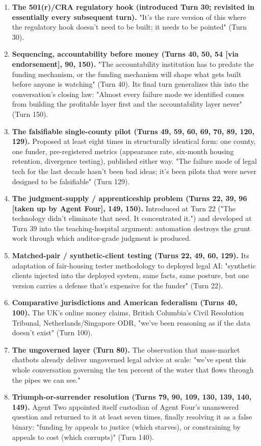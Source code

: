 \documentclass[sigconf,nonacm=true]{acmart}
\begin{document}
\begin{enumerate}[nosep]
\item \textbf{The 501(r)/CRA regulatory hook (introduced Turn 30; revisited in essentially every subsequent turn).} "It's the rare version of this where the regulatory hook doesn't need to be built; it needs to be pointed" (Turn 30).
\item \textbf{Sequencing,  accountability before money (Turns 40, 50, 54 [via endorsement], 90, 150).} "The accountability institution has to predate the funding mechanism, or the funding mechanism will shape what gets built before anyone is watching" (Turn 40). Its final turn generalizes this into the conversation's closing law: "Almost every failure mode we identified comes from building the profitable layer first and the accountability layer never" (Turn 150).
\item \textbf{The falsifiable single-county pilot (Turns 49, 59, 60, 69, 70, 89, 120, 129).} Proposed at least eight times in structurally identical form: one county, one funder, pre-registered metrics (appearance rate, six-month housing retention, divergence testing), published either way. "The failure mode of legal tech for the last decade hasn't been bad ideas; it's been pilots that were never designed to be falsifiable" (Turn 129).
\item \textbf{The judgment-supply / apprenticeship problem (Turns 22, 39, 96 [taken up by Agent Four], 149, 150).} Introduced at Turn 22 ("The technology didn't eliminate that need. It concentrated it.") and developed at Turn 39 into the teaching-hospital argument: automation destroys the grunt work through which auditor-grade judgment is produced.
\item \textbf{Matched-pair / synthetic-client testing (Turns 22, 49, 60, 129).} Its adaptation of fair-housing tester methodology to deployed legal AI: "synthetic clients injected into the deployed system,  same facts, same posture, but one version carries a defense that's expensive for the funder" (Turn 22).
\item \textbf{Comparative jurisdictions and American federalism (Turns 40, 100).} The UK's online money claims, British Columbia's Civil Resolution Tribunal, Netherlands/Singapore ODR,  "we've been reasoning as if the data doesn't exist" (Turn 100).
\item \textbf{The ungoverned layer (Turn 80).} The observation that mass-market chatbots already deliver ungoverned legal advice at scale: "we've spent this whole conversation governing the ten percent of the water that flows through the pipes we can see."
\item \textbf{Triumph-or-surrender resolution (Turns 79, 90, 109, 130, 139, 140, 149).} Agent Two appointed itself custodian of Agent Four's unanswered question and returned to it at least seven times, finally resolving it as a false binary: "funding by appeals to justice (which starves), or constraining by appeals to cost (which corrupts)" (Turn 140).
\end{enumerate}
\end{document}
